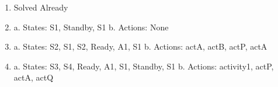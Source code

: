 \documentclass[11pt]{article}
\author{Christian Johnson}
\date{\today}
\title{}
\begin{document}
\begin{enumerate}
\item Solved Already

\item a. States: S1, Standby, S1
b. Actions: None
\item a. States: S2, S1, S2, Ready, A1, S1
b. Actions: actA, actB, actP, actA
\item a. States: S3, S4, Ready, A1, S1, Standby, S1
b. Actions: activity1, actP, actA, actQ
\end{enumerate}
\end{document}
